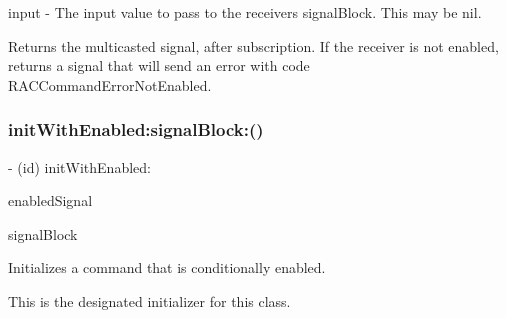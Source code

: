 input -\/ The input value to pass to the receiver\textquotesingle{}s {\ttfamily signal\+Block}. This may be nil.

Returns the multicasted signal, after subscription. If the receiver is not enabled, returns a signal that will send an error with code R\+A\+C\+Command\+Error\+Not\+Enabled. \mbox{\label{interface_r_a_c_command_a753274fc1cc9abfebbd5488a0a09adab}} 
\subsubsection{\texorpdfstring{init\+With\+Enabled\+:signal\+Block\+:()}{initWithEnabled:signalBlock:()}\hspace{0.1cm}{\footnotesize\ttfamily [1/3]}}
{\footnotesize\ttfamily -\/ (id) init\+With\+Enabled\+: \begin{DoxyParamCaption}\item[{(\mbox{\hyperlink{interface_r_a_c_signal}{R\+A\+C\+Signal}} $\ast$)}]{enabled\+Signal }\item[{signalBlock:(\mbox{\hyperlink{interface_r_a_c_signal}{R\+A\+C\+Signal}} $\ast$($^\wedge$)(id input))}]{signal\+Block }\end{DoxyParamCaption}}

Initializes a command that is conditionally enabled.

This is the designated initializer for this class.


